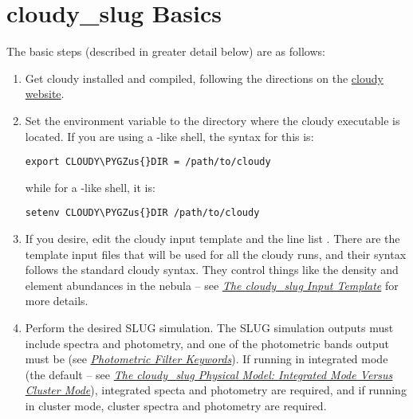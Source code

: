 \documentclass[letterpaper,10pt,english]{sphinxmanual}
\def\PYGZus{\char`\_}
\begin{document}
\section{cloudy\_slug Basics}
\label{cloudy:cloudy-slug-basics}
The basic steps (described in greater detail below) are as follows:
\begin{enumerate}
\item {} 
Get cloudy installed and compiled, following the directions on the
\href{http://nublado.org/}{cloudy website}.

\item {} 
Set the environment variable  to the directory where
the cloudy executable  is located.  If you are using
a -like shell, the syntax for this is:

\begin{Verbatim}[commandchars=\\\{\}]
export CLOUDY\PYGZus{}DIR = /path/to/cloudy
\end{Verbatim}

while for a -like shell, it is:

\begin{Verbatim}[commandchars=\\\{\}]
setenv CLOUDY\PYGZus{}DIR /path/to/cloudy
\end{Verbatim}

\item {} 
If you desire, edit the cloudy input template
 and the line list
. There are the template input files
that will be used for all the cloudy runs, and their syntax follows
the standard cloudy syntax. They control things like the density and
element abundances in the nebula -- see {\hyperref[cloudy:ssec-cloudy-template]{\emph{The cloudy\_slug Input Template}}}
for more details.

\item {} 
Perform the desired SLUG simulation. The SLUG simulation outputs
must include spectra and photometry, and one of the photometric
bands output must be  (see {\hyperref[parameters:ssec-phot-keywords]{\emph{Photometric Filter Keywords}}}). If
running in integrated mode (the default -- see
{\hyperref[cloudy:ssec-cloudy-cluster]{\emph{The cloudy\_slug Physical Model: Integrated Mode Versus Cluster Mode}}}), integrated specta and photometry are
required, and if running in cluster mode, cluster spectra and
photometry are required.


\end{enumerate}
\end{document}
